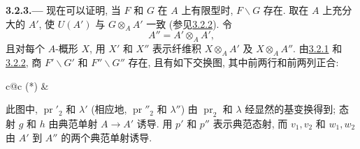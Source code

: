 
\medskip
{}\label{par:sga3-VIA-3.2.3}%
\noindent\textbf{3.2.3.---}
现在可以证明, 当 \(F\) 和 \(G\) 在 \(A\) 上有限型时,
\(F\backslash G\) 存在.
取在 \(A\) 上充分大的 \(A'\), 使 \(U(A')\) 与 \(G\otimes_AA'\) 一致
(参见\hyperref[par:sga3-VIA-3.2.2]{3.2.2}). 令
\[
  A''=A'\otimes_AA',
\]
且对每个 \(A\)-概形 \(X\), 用 \(X'\) 和 \(X''\)
表示纤维积 \(X\otimes_AA'\) 及 \(X\otimes_AA''\).
由\hyperref[par:sga3-VIA-3.2.1]{3.2.1} 和\hyperref[par:sga3-VIA-3.2.2]{3.2.2},
商 \(F'\backslash G'\) 和 \(F''\backslash G''\) 存在,
且有如下交换图, 其中前两行和前两列正合:
\begin{center}
  \label{diag:sga3-VIA-3.2.3-exact-descent}%
  \begin{tabular}{c@{\qquad}c}
    \textup{(*)}
    &
  \end{tabular}
\end{center}

此图中, \(\operatorname{pr}'_2\) 和 \(\lambda'\)
(相应地, \(\operatorname{pr}''_2\) 和 \(\lambda''\))
由 \(\operatorname{pr}_2\) 和 \(\lambda\) 经显然的基变换得到;
态射 \(g\) 和 \(h\) 由典范单射 \(A\to A'\) 诱导.
用 \(p'\) 和 \(p''\) 表示典范态射,
而 \(v_1,v_2\) 和 \(w_1,w_2\) 由 \(A'\) 到 \(A''\) 的两个典范单射诱导.

